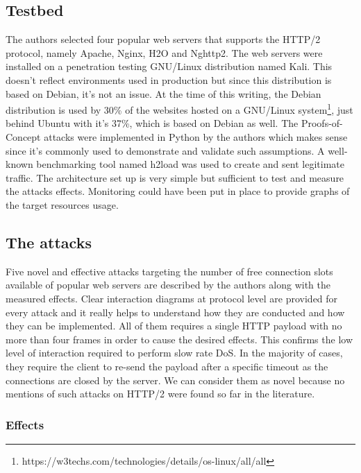 \documentclass[11pt, a4paper]{article}
\begin{document}
\subsection{Testbed}

The authors selected four popular web servers that supports the HTTP/2 protocol, namely Apache, Nginx, H2O and Nghttp2.
The web servers were installed on a penetration testing GNU/Linux distribution named Kali.
This doesn't reflect environments used in production but since this distribution is based on Debian, it's not an issue.
At the time of this writing, the Debian distribution is used by 30\% of the websites hosted on a GNU/Linux system\footnote{https://w3techs.com/technologies/details/os-linux/all/all}, just behind Ubuntu with it's 37\%, which is based on Debian as well.
The Proofs-of-Concept attacks were implemented in Python by the authors which makes sense since it's commonly used to demonstrate and validate such assumptions.
A well-known benchmarking tool named h2load was used to create and sent legitimate traffic.
The architecture set up is very simple but sufficient to test and measure the attacks effects.
Monitoring could have been put in place to provide graphs of the target resources usage.

\subsection{The attacks}

Five novel and effective attacks targeting the number of free connection slots available of popular web servers are described by the authors along with the measured effects.
Clear interaction diagrams at protocol level are provided for every attack and it really helps to understand how they are conducted and how they can be implemented.
All of them requires a single HTTP payload with no more than four frames in order to cause the desired effects.
This confirms the low level of interaction required to perform slow rate DoS.
In the majority of cases, they require the client to re-send the payload after a specific timeout as the connections are closed by the server.
We can consider them as novel because no mentions of such attacks on HTTP/2 were found so far in the literature.

\subsubsection{Effects}
\end{document}
